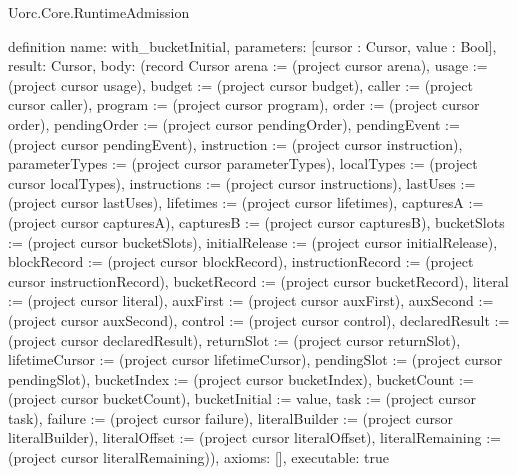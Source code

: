 \begin{lexlean}{Uorc.Core.RuntimeAdmission}
\begin{semanticmodule}
definition{
  name: with_bucketInitial,
  parameters: [cursor : Cursor, value : Bool],
  result: Cursor,
  body: (record Cursor {arena := (project cursor arena), usage := (project cursor usage), budget := (project cursor budget), caller := (project cursor caller), program := (project cursor program), order := (project cursor order), pendingOrder := (project cursor pendingOrder), pendingEvent := (project cursor pendingEvent), instruction := (project cursor instruction), parameterTypes := (project cursor parameterTypes), localTypes := (project cursor localTypes), instructions := (project cursor instructions), lastUses := (project cursor lastUses), lifetimes := (project cursor lifetimes), capturesA := (project cursor capturesA), capturesB := (project cursor capturesB), bucketSlots := (project cursor bucketSlots), initialRelease := (project cursor initialRelease), blockRecord := (project cursor blockRecord), instructionRecord := (project cursor instructionRecord), bucketRecord := (project cursor bucketRecord), literal := (project cursor literal), auxFirst := (project cursor auxFirst), auxSecond := (project cursor auxSecond), control := (project cursor control), declaredResult := (project cursor declaredResult), returnSlot := (project cursor returnSlot), lifetimeCursor := (project cursor lifetimeCursor), pendingSlot := (project cursor pendingSlot), bucketIndex := (project cursor bucketIndex), bucketCount := (project cursor bucketCount), bucketInitial := value, task := (project cursor task), failure := (project cursor failure), literalBuilder := (project cursor literalBuilder), literalOffset := (project cursor literalOffset), literalRemaining := (project cursor literalRemaining)}),
  axioms: [],
  executable: true
}


\end{semanticmodule}
\end{lexlean}
